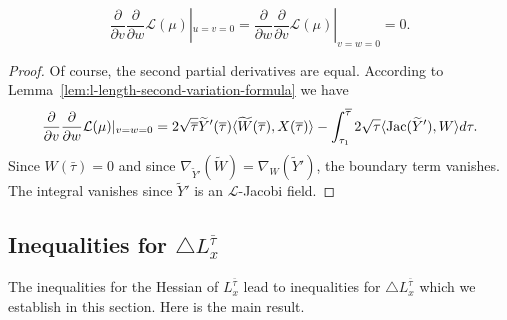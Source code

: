 \begin{claim}\label{claim:mixed-partials-vanish}

$$\frac{\partial}{\partial v}\frac{\partial}{\partial w}{\mathcal L}(\mu)|_{u=v=0}=
\frac{\partial}{\partial w}\frac{\partial}{\partial v}{\mathcal
L}(\mu)|_{v=w=0}=0.$$
\end{claim}
\begin{proof}
\sketch Of course, the second partial derivatives are equal. According to
Lemma~\ref{lem:l-length-second-variation-formula} we have
$$\frac{\partial}{\partial v}\frac{\partial}{\partial w}{\mathcal L}(\mu)|_{v=w=0}
=2\sqrt{\overline\tau} \widetilde Y'(\overline\tau)\langle \widetilde
W(\overline\tau),X(\overline\tau)\rangle-\int_{\tau_1}^{\overline\tau}2\sqrt{\tau}\langle
\operatorname{Jac}(\widetilde Y'),W\rangle d\tau.$$ Since $W(\bar\tau)=0$ and
since $\nabla_{\widetilde Y'}(\widetilde W)=\nabla_W(\widetilde
Y')$, the boundary term vanishes. The integral vanishes since
$\widetilde Y'$ is an ${\mathcal L}$-Jacobi field.
\end{proof}

\subsection{Inequalities for $\triangle L_x^{\bar\tau}$}

The inequalities for the Hessian of $L_x^{\bar\tau}$ lead to
inequalities for $\triangle L_x^{\bar\tau}$ which we establish in this section. Here is the
main result.


